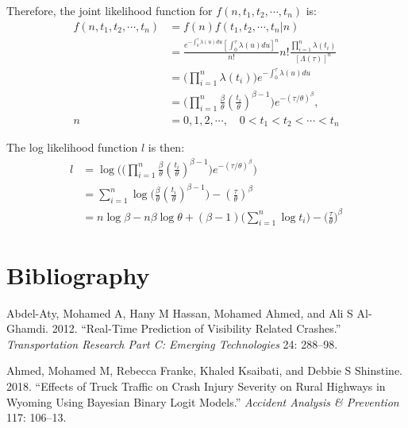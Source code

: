 \documentclass[12pt]{book}
\numberwithin{equation}{chapter}
\begin{document}
Therefore, the joint likelihood function for \(f(n, t_1, t_2, \cdots, t_n)\) is:
\begin{equation}
\begin{aligned}
f(n, t_1, t_2, \cdots, t_n) & = f(n)f(t_1, t_2, \cdots, t_n|n)\\
& = \frac{e^{-\int_0^\tau \lambda(u)du}[\int_0^\tau \lambda(u)du]^n}{n!}n!\frac{\prod_{i=1}^n\lambda(t_i)}{[\Lambda(\tau)]^n}\\
& = \Big(\prod_{i=1}^n\lambda(t_i) \Big)e^{-\int_0^\tau \lambda(u)du}\\
& = \Big(\prod_{i=1}^n\frac{\beta}{\theta}(\frac{t_i}{\theta})^{\beta - 1} \Big)e^{-(\tau/\theta)^\beta},\\ 
n & = 0, 1, 2, \cdots, \quad  0 < t_1 < t_2 < \cdots < t_n
\end{aligned}
\end{equation}

The log likelihood function \(l\) is then:
\begin{equation}
\begin{aligned}
l & = \log \Bigg(\Big(\prod_{i=1}^n\frac{\beta}{\theta}(\frac{t_i}{\theta})^{\beta - 1}\Big)e^{-(\tau/\theta)^\beta}\Bigg)\\
& = \sum_{i=1}^n\log\Big(\frac{\beta}{\theta}(\frac{t_i}{\theta})^{\beta - 1}\Big) - (\frac{\tau}{\theta})^\beta\\
& = n\log\beta - n\beta\log\theta + (\beta - 1)\bigg(\sum_{i=1}^n\log t_i\bigg) - \Big(\frac{\tau}{\theta}\Big)^\beta
\end{aligned}
\end{equation}

\cleardoublepage

\hypertarget{bibliography}{%
\chapter*{Bibliography}\label{bibliography}}

\hypertarget{refs}{}
\leavevmode\hypertarget{ref-abdel2012real}{}%
Abdel-Aty, Mohamed A, Hany M Hassan, Mohamed Ahmed, and Ali S Al-Ghamdi. 2012. ``Real-Time Prediction of Visibility Related Crashes.'' \emph{Transportation Research Part C: Emerging Technologies} 24: 288--98.

\leavevmode\hypertarget{ref-ahmed2018effects}{}%
Ahmed, Mohamed M, Rebecca Franke, Khaled Ksaibati, and Debbie S Shinstine. 2018. ``Effects of Truck Traffic on Crash Injury Severity on Rural Highways in Wyoming Using Bayesian Binary Logit Models.'' \emph{Accident Analysis \& Prevention} 117: 106--13.
\end{document}
